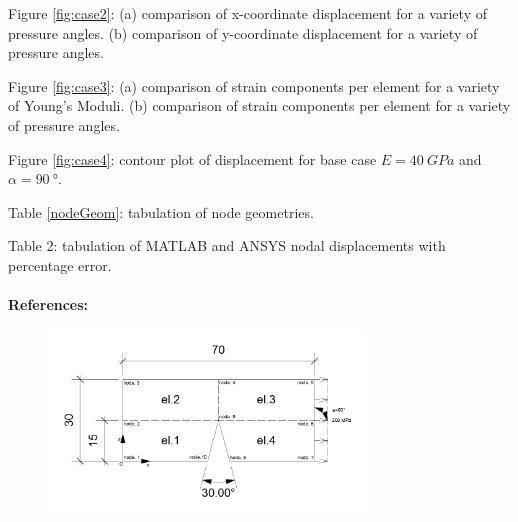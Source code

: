 \documentclass[11pt]{article}
\begin{document}
Figure \ref{fig:case2}: (a) comparison of x-coordinate displacement for a variety of pressure angles. (b) comparison of y-coordinate displacement for a variety of pressure angles.

Figure \ref{fig:case3}: (a) comparison of strain components per element for a variety of Young's Moduli. (b) comparison of strain components per element for a variety of pressure angles.

Figure \ref{fig:case4}: contour plot of displacement for base case $E = \SI{40}{GPa}$ and $\alpha = \SI{90}{\degree}$.

Table \ref{nodeGeom}: tabulation of node geometries.

Table 2: tabulation of MATLAB and ANSYS nodal displacements with percentage error.
\\
\\
\textbf{References:}


\newpage
\begin{figure}[H]
    \centering
    \includegraphics[width = 0.75\textwidth]{img/geom.png}
    \caption{}
    \label{geom}
\end{figure}
\end{document}

